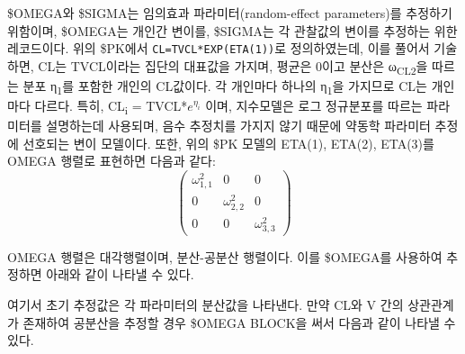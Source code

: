 \documentclass[
  10pt,
  krantz2,
  a4paper]{krantz}
\newenvironment{Shaded}{\begin{snugshade}}{\end{snugshade}}
\newcommand{\DecValTok}[1]{\textcolor[rgb]{0.00,0.00,0.81}{#1}}
\newcommand{\FloatTok}[1]{\textcolor[rgb]{0.00,0.00,0.81}{#1}}
\newcommand{\KeywordTok}[1]{\textcolor[rgb]{0.13,0.29,0.53}{\textbf{#1}}}
\newcommand{\NormalTok}[1]{#1}
\newcommand{\OperatorTok}[1]{\textcolor[rgb]{0.81,0.36,0.00}{\textbf{#1}}}
\theoremstyle{definition}
\theoremstyle{definition}
\theoremstyle{definition}
\theoremstyle{remark}
\begin{document}
\$OMEGA와 \$SIGMA는 임의효과 파라미터(random-effect parameters)를 추정하기 위함이며, \$OMEGA는 개인간 변이를, \$SIGMA는 각 관찰값의 변이를 추정하는 위한 레코드이다. 위의 \$PK에서 \texttt{CL=TVCL*EXP(ETA(1))}로 정의하였는데, 이를 풀어서 기술하면, CL는 TVCL이라는 집단의 대표값을 가지며, 평균은 0이고 분산은 ω\textsubscript{CL2}을 따르는 분포 η\textsubscript{1}를 포함한 개인의 CL값이다. 각 개인마다 하나의 η\textsubscript{1}을 가지므로 CL는 개인마다 다르다. 특히, CL\textsubscript{i} = TVCL*\(e^{\eta_{i}}\) 이며, 지수모델은 로그 정규분포를 따르는 파라미터를 설명하는데 사용되며, 음수 추정치를 가지지 않기 때문에 약동학 파라미터 추정에 선호되는 변이 모델이다. 또한, 위의 \$PK 모델의 ETA(1), ETA(2), ETA(3)를 OMEGA 행렬로 표현하면 다음과 같다:
\begin{equation}
\begin{pmatrix} 
   \omega_{1,1}^2 & 0 & 0 \\
   0 & \omega_{2,2}^2 & 0 \\
   0 & 0 & \omega_{3,3}^2
\label{eq:iivomega}
\end{pmatrix}
\end{equation}

OMEGA 행렬은 대각행렬이며, 분산-공분산 행렬이다. 이를 \$OMEGA를 사용하여 추정하면 아래와 같이 나타낼 수 있다.

\begin{Shaded}
\end{Shaded}

여기서 초기 추정값은 각 파라미터의 분산값을 나타낸다. 만약 CL와 V 간의 상관관계가 존재하여 공분산을 추정할 경우 \$OMEGA BLOCK을 써서 다음과 같이 나타낼 수 있다.

\begin{Shaded}
\end{Shaded}
\end{document}
